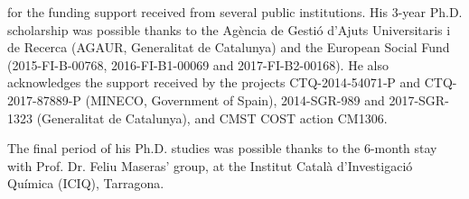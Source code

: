
 for the funding support received from several public institutions. His 3-year Ph.D. scholarship was possible thanks to the Agència de Gestió d'Ajuts Universitaris i de Recerca (AGAUR, Generalitat de Catalunya) and the European Social Fund (2015-FI-B-00768, 2016-FI-B1-00069 and 2017-FI-B2-00168). He also acknowledges the support received by the projects CTQ-2014‐54071‐P and CTQ-2017-87889-P (MINECO, Government of Spain), 2014-SGR-989 and 2017-SGR-1323 (Generalitat de Catalunya), and CMST COST action CM1306.

The final period of his Ph.D. studies was possible thanks to the 6-month stay with Prof. Dr. Feliu Maseras' group, at the Institut Català d'Investigació Química (ICIQ), Tarragona.

~ \\
